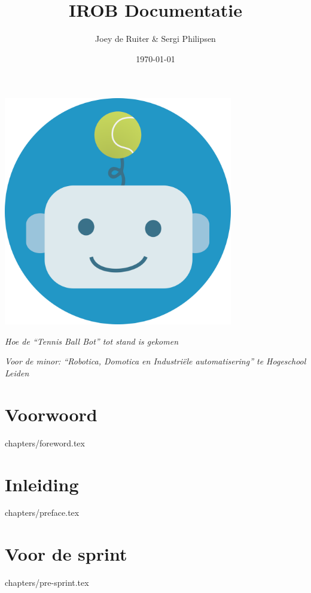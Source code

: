 \documentclass{article}
\title{IROB Documentatie}
\author{Joey de Ruiter \& Sergi Philipsen}
\date{\today}
\newcommand{\quotes}[1]{``#1''}
\begin{document}
\maketitle

\vspace{10mm}

\centerline{\includegraphics[height=100mm]{img/logo.png}}

\vspace{10mm}

\centerline{
    \textit{Hoe de \quotes{Tennis Ball Bot} tot stand is gekomen}
}
\centerline{
    \textit{Voor de minor: \quotes{Robotica, Domotica en Industriële automatisering} te Hogeschool Leiden}
}

\clearpage

\section*{Voorwoord}
{chapters/foreword.tex}
\clearpage

\tableofcontents
\clearpage

\section{Inleiding}
{chapters/preface.tex}
\clearpage

\section{Voor de sprint}
{chapters/pre-sprint.tex}
\clearpage
\end{document}
